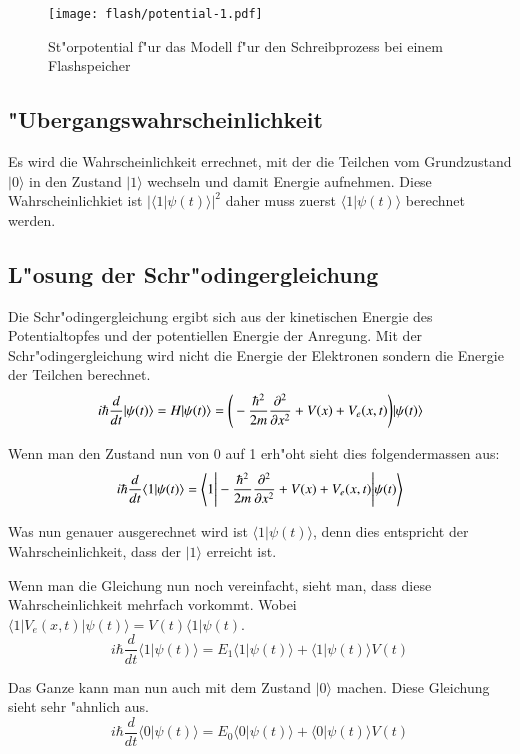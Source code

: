 \begin{refsection}
\begin{figure}
\centering
\texttt{[image: flash/potential-1.pdf]}
\caption{St"orpotential f"ur das Modell f"ur den Schreibprozess bei
einem Flashspeicher
\label{flash:Anregung}}
\end{figure}

\subsection{"Ubergangswahrscheinlichkeit}
Es wird die Wahrscheinlichkeit errechnet, mit der die Teilchen
vom Grundzustand $|0\rangle$ in den Zustand $|1\rangle$ wechseln
und damit Energie aufnehmen. 
Diese Wahrscheinlichkiet ist $\vert\langle1|\psi(t)\rangle\vert^2$
daher muss zuerst $\langle1|\psi(t)\rangle$ berechnet werden.

\subsection{L"osung der Schr"odingergleichung}
Die Schr"odingergleichung ergibt sich aus der kinetischen Energie des
Potentialtopfes und der potentiellen Energie der Anregung.
Mit der Schr"odingergleichung wird nicht die Energie der Elektronen
sondern die Energie der Teilchen berechnet.
\[
i\hbar\frac{d}{dt}|\psi(t)\rangle = H|\psi(t)\rangle = \Bigg{(}-\frac{\hbar^2}{2m} \frac{\partial^2}{\partial x^2}+V(x)+V_{e}(x,t)\Bigg{)}|\psi(t)\rangle
\]

Wenn man den Zustand nun von 0 auf 1 erh"oht sieht dies folgendermassen aus:
\[
i\hbar\frac{d}{dt}\langle1|\psi(t)\rangle = \Bigg{\langle}1\Bigg{|}-\frac{\hbar^2}{2m} \frac{\partial^2}{\partial x^2}+V(x)+V_{e}(x,t)\Bigg{|}\psi(t)\Bigg{\rangle}
\]

Was nun genauer ausgerechnet wird ist $\langle1|\psi(t)\rangle$, denn
dies entspricht der Wahrscheinlichkeit, dass der $|1\rangle$ erreicht ist.

Wenn man die Gleichung nun noch vereinfacht, sieht man, dass diese
Wahrscheinlichkeit mehrfach vorkommt.
Wobei $\langle1|V_e(x,t)|\psi(t)\rangle = V(t)\langle1|\psi(t)$.  
\[
i\hbar\frac{d}{dt}\langle1|\psi(t)\rangle = E_{1}\langle1|\psi(t)\rangle+\langle1|\psi(t)\rangle V(t)
\]

Das Ganze kann man nun auch mit dem Zustand $|0\rangle$ machen. Diese
Gleichung sieht sehr "ahnlich aus.
\[
i\hbar\frac{d}{dt}\langle0|\psi(t)\rangle = E_{0}\langle0|\psi(t)\rangle+\langle0|\psi(t)\rangle V(t)
\]


\end{refsection}
